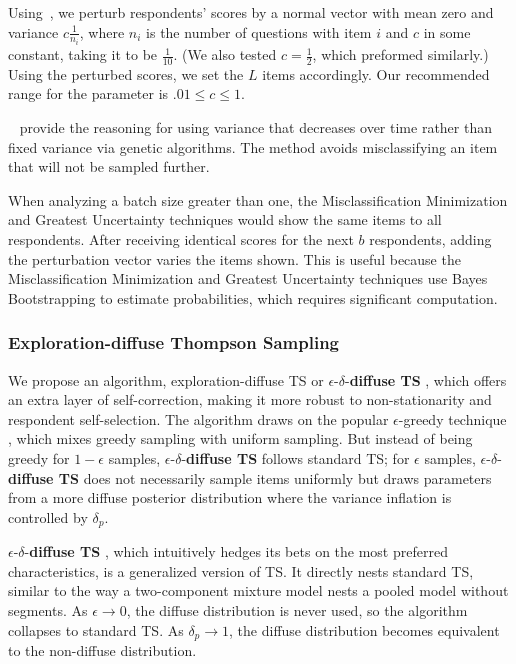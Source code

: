 \documentclass[nonblindrev]{informs3}
\newcommand{\edts}{$\epsilon$-$\delta$-\textbf{diffuse TS} }
\newcommand{\numperset}{L}
\begin{document}
Using~\cite{toubia2007adaptive},  we perturb respondents' scores by a normal vector with mean zero and variance $c\frac{1}{n_i}$, where $n_i$ is the number of questions with item $i$ and $c$ in some constant, taking it to be $\frac{1}{10}$. (We also tested $c=\frac{1}{2}$, which preformed similarly.) Using the perturbed scores, we set the $\numperset$ items accordingly. Our recommended range for the parameter is $.01 \leq c \leq 1$.

~\cite{toubia2007adaptive} provide the reasoning for using variance that decreases over time rather than fixed variance via genetic algorithms. The method avoids misclassifying an item that will not be sampled further.

When analyzing a batch size greater than one, the Misclassification Minimization and Greatest Uncertainty techniques would show the same items to all respondents. After receiving identical scores for the next $b$ respondents, adding the perturbation vector varies the items shown. This is useful because the Misclassification Minimization and Greatest Uncertainty techniques use Bayes Bootstrapping to estimate probabilities, which requires significant computation.

\subsubsection{Exploration-diffuse Thompson Sampling} \label{sec:edts}

We propose an algorithm, exploration-diffuse TS or \edts, which offers an extra layer of self-correction, making it more robust to non-stationarity and respondent self-selection. The algorithm draws on the popular $\epsilon$-greedy technique \citep{SuttonBarto1998}, which mixes greedy sampling with uniform sampling. But instead of being greedy for $1-\epsilon$ samples, \edts follows standard TS; for $\epsilon$ samples, \edts does not necessarily sample items uniformly but draws parameters from a more diffuse posterior distribution where the variance inflation is controlled by $\delta_p$.

\edts, which intuitively hedges its bets on the most preferred characteristics, is a generalized version of TS. It directly nests standard TS, similar to the way a two-component mixture model nests a pooled model without segments. As $\epsilon \to 0$, the diffuse distribution is never used, so the algorithm collapses to standard TS. As $\delta_p \to 1$, the diffuse distribution becomes equivalent to the non-diffuse distribution. 
\end{document}
